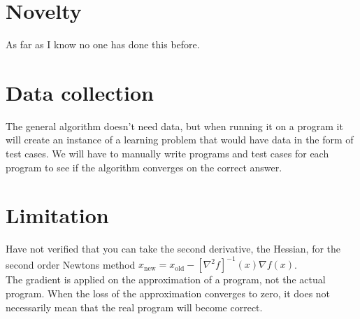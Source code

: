 \documentclass{article}
\begin{document}
\section*{Novelty}
As far as I know no one has done this before.

\section*{Data collection}
The general algorithm doesn't need data, but when running it on a program it will create an instance of a learning problem that would have data in the form of test cases. We will have to manually write programs and test cases for each program to see if the algorithm converges on the correct answer.

\section*{Limitation}
Have not verified that you can take the second derivative, the Hessian, for the second order Newtons method $x_{\mathrm{new}} = x_{\mathrm{old}} - [\nabla^2 f]^{-1}(x) \nabla f(x)$.\\
The gradient is applied on the approximation of a program, not the actual program. When the loss of the approximation converges to zero, it does not necessarily mean that the real program will become correct.


\end{document}
